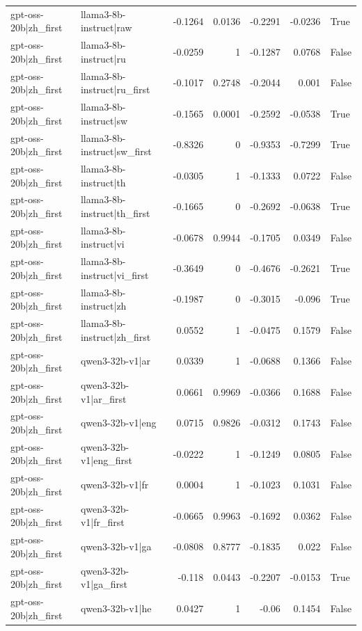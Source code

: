 \begin{table}
\begin{tabular}{l l r r r r l}
gpt-oss-20b|zh_first & llama3-8b-instruct|raw & -0.1264 & 0.0136 & -0.2291 & -0.0236 & True \\
gpt-oss-20b|zh_first & llama3-8b-instruct|ru & -0.0259 & 1 & -0.1287 & 0.0768 & False \\
gpt-oss-20b|zh_first & llama3-8b-instruct|ru_first & -0.1017 & 0.2748 & -0.2044 & 0.001 & False \\
gpt-oss-20b|zh_first & llama3-8b-instruct|sw & -0.1565 & 0.0001 & -0.2592 & -0.0538 & True \\
gpt-oss-20b|zh_first & llama3-8b-instruct|sw_first & -0.8326 & 0 & -0.9353 & -0.7299 & True \\
gpt-oss-20b|zh_first & llama3-8b-instruct|th & -0.0305 & 1 & -0.1333 & 0.0722 & False \\
gpt-oss-20b|zh_first & llama3-8b-instruct|th_first & -0.1665 & 0 & -0.2692 & -0.0638 & True \\
gpt-oss-20b|zh_first & llama3-8b-instruct|vi & -0.0678 & 0.9944 & -0.1705 & 0.0349 & False \\
gpt-oss-20b|zh_first & llama3-8b-instruct|vi_first & -0.3649 & 0 & -0.4676 & -0.2621 & True \\
gpt-oss-20b|zh_first & llama3-8b-instruct|zh & -0.1987 & 0 & -0.3015 & -0.096 & True \\
gpt-oss-20b|zh_first & llama3-8b-instruct|zh_first & 0.0552 & 1 & -0.0475 & 0.1579 & False \\
gpt-oss-20b|zh_first & qwen3-32b-v1|ar & 0.0339 & 1 & -0.0688 & 0.1366 & False \\
gpt-oss-20b|zh_first & qwen3-32b-v1|ar_first & 0.0661 & 0.9969 & -0.0366 & 0.1688 & False \\
gpt-oss-20b|zh_first & qwen3-32b-v1|eng & 0.0715 & 0.9826 & -0.0312 & 0.1743 & False \\
gpt-oss-20b|zh_first & qwen3-32b-v1|eng_first & -0.0222 & 1 & -0.1249 & 0.0805 & False \\
gpt-oss-20b|zh_first & qwen3-32b-v1|fr & 0.0004 & 1 & -0.1023 & 0.1031 & False \\
gpt-oss-20b|zh_first & qwen3-32b-v1|fr_first & -0.0665 & 0.9963 & -0.1692 & 0.0362 & False \\
gpt-oss-20b|zh_first & qwen3-32b-v1|ga & -0.0808 & 0.8777 & -0.1835 & 0.022 & False \\
gpt-oss-20b|zh_first & qwen3-32b-v1|ga_first & -0.118 & 0.0443 & -0.2207 & -0.0153 & True \\
gpt-oss-20b|zh_first & qwen3-32b-v1|he & 0.0427 & 1 & -0.06 & 0.1454 & False \\

\end{tabular}
\end{table}
